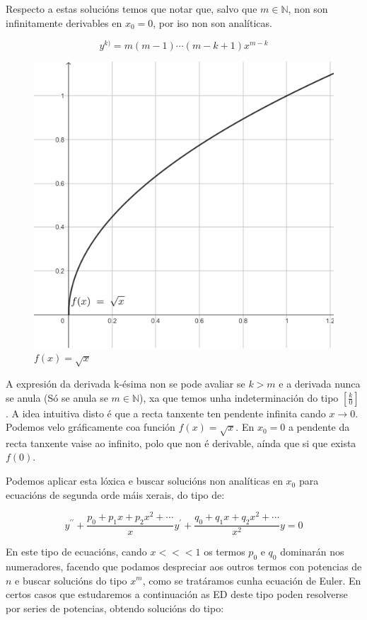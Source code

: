 \documentclass[a4paper,12pt,titlepage]{article}
\begin{document}
Respecto a estas solucións temos que notar que, salvo que $m\in\mathbb{N}$, non son infinitamente derivables en $x_0=0$, por iso non son analíticas.

\begin{equation*}
    y^{k)}=m(m-1) \cdots(m-k+1) x^{m-k}
\end{equation*}

\begin{figure}
    \centering
    \includegraphics[width=0.75\linewidth]{Images/sqrtx.png}
    \caption{$f(x)=\sqrt{x}$}
\end{figure}

A expresión da derivada k-ésima non se pode avaliar se $k>m$ e a derivada nunca se anula (Só se anula se $m\in\mathbb{N}$), xa que temos unha indeterminación do tipo $[\frac{k}{0}]$. A idea intuitiva disto é que a recta tanxente ten pendente infinita cando $x\to 0$. Podemos velo gráficamente coa función $f(x)=\sqrt{x}$. En $x_0=0$ a pendente da recta tanxente vaise ao infinito, polo que non é derivable, aínda que si que exista $f(0)$.

\par Podemos aplicar esta lóxica e buscar solucións non analíticas en $x_0$ para ecuacións de segunda orde máis xerais, do tipo de:

\begin{equation*}
    y^{\prime \prime}+\frac{p_{0}+p_{1} x+p_{2} x^{2}+\cdots}{x} y^{\prime}+\frac{q_{0}+q_{1} x+q_{2} x^{2}+\cdots}{x^{2}} y=0
\end{equation*}

En este tipo de ecuacións, cando $x<<<1$ os termos $p_0$ e $q_0$ dominarán nos numeradores, facendo que podamos despreciar aos outros termos con potencias de $n$ e buscar solucións do tipo $x^m$, como se tratáramos cunha ecuación de Euler. En certos casos que estudaremos a continuación as ED deste tipo poden resolverse por series de potencias, obtendo solucións do tipo:
\end{document}
